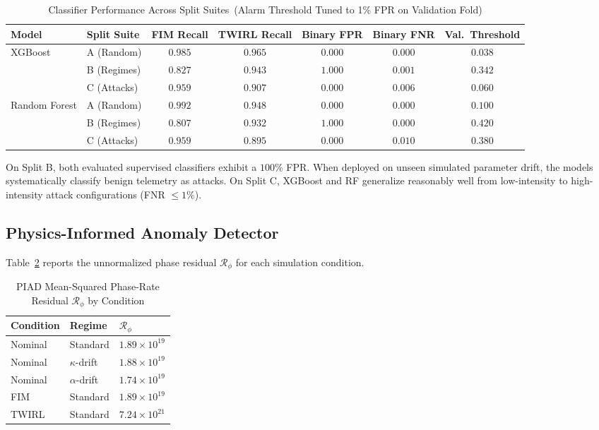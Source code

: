 \documentclass[journal,twocolumn]{IEEEtran}
\newcommand{\Rphase}{\mathcal{R}_{\!\phi}}
\newcommand{\kap}{\kappa}
\begin{document}
\begin{table}[t]
  \centering
  \caption{Classifier Performance Across Split Suites~(Alarm Threshold Tuned to 1\% FPR on Validation Fold)}
  \label{tab:results}
  \renewcommand{\arraystretch}{1.2}
  \begin{tabular}{@{}llccccc@{}}
    \toprule
    Model & Split Suite & FIM Recall & TWIRL Recall & Binary FPR & Binary FNR
           & Val.\ Threshold \\
    \midrule
    \multirow{3}{*}{XGBoost}
      & A (Random)  & $0.985$ & $0.965$ & $0.000$ & $0.000$ & $0.038$ \\
      & B (Regimes) & $0.827$ & $0.943$ & $\mathbf{1.000}$ & $0.001$ & $0.342$ \\
      & C (Attacks) & $0.959$ & $0.907$ & $0.000$ & $0.006$ & $0.060$ \\[4pt]
    \multirow{3}{*}{Random Forest}
      & A (Random)  & $0.992$ & $0.948$ & $0.000$ & $0.000$ & $0.100$ \\
      & B (Regimes) & $0.807$ & $0.932$ & $\mathbf{1.000}$ & $0.000$ & $0.420$ \\
      & C (Attacks) & $0.959$ & $0.895$ & $0.000$ & $0.010$ & $0.380$ \\
    \bottomrule
  \end{tabular}
\end{table}

On Split B, both evaluated supervised classifiers exhibit a $100\%$ FPR. When deployed on unseen simulated parameter drift, the models systematically classify benign telemetry as attacks. On Split C, XGBoost and RF generalize reasonably well from low-intensity to high-intensity attack configurations (FNR $\leq 1\%$).

\subsection{Physics-Informed Anomaly Detector}

Table~\ref{tab:residuals} reports the unnormalized phase residual $\Rphase$ for each simulation condition. 

\begin{table}[t]
  \centering
  \caption{PIAD Mean-Squared Phase-Rate Residual $\Rphase$ by Condition}
  \label{tab:residuals}
  \renewcommand{\arraystretch}{1.15}
  \begin{tabular}{@{}lll@{}}
    \toprule
    Condition & Regime & $\Rphase$ \\
    \midrule
    Nominal & Standard     & $1.89 \times 10^{19}$ \\
    Nominal & $\kap$-drift & $1.88 \times 10^{19}$ \\
    Nominal & $\alpha$-drift & $1.74 \times 10^{19}$ \\
    FIM     & Standard     & $1.89 \times 10^{19}$ \\
    TWIRL   & Standard     & $7.24 \times 10^{21}$ \\
    \bottomrule
  \end{tabular}
\end{table}
\end{document}
